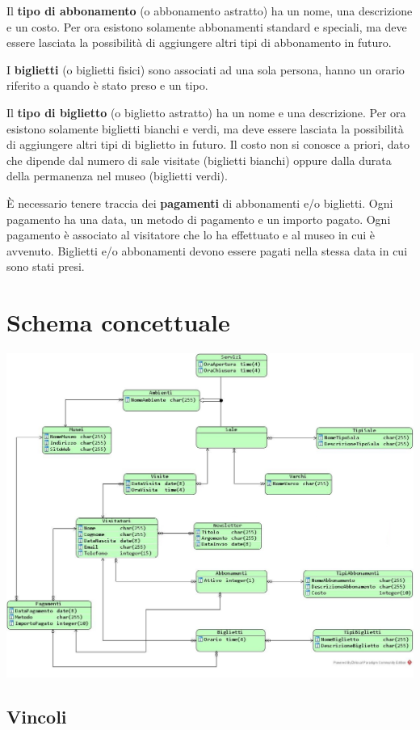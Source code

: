 \documentclass[a4paper, 12pt]{article}
\begin{document}
\noindent Il \textbf{tipo di abbonamento} (o abbonamento astratto) ha un nome, una descrizione e un costo.  Per ora esistono solamente abbonamenti standard e speciali, ma deve essere lasciata la possibilità di aggiungere altri tipi di abbonamento in futuro.

\noindent I \textbf{biglietti} (o biglietti fisici) sono associati ad una sola persona, hanno un orario riferito a quando è stato preso e un tipo.

\noindent Il \textbf{tipo di biglietto} (o biglietto astratto) ha un nome e una descrizione. Per ora esistono solamente biglietti bianchi e verdi, ma deve essere lasciata la possibilità di aggiungere altri tipi di biglietto in futuro. Il costo non si conosce a priori, dato che dipende dal numero di sale visitate (biglietti bianchi) oppure dalla durata della permanenza nel museo (biglietti verdi).

\noindent È necessario tenere traccia dei \textbf{pagamenti} di abbonamenti e/o biglietti. Ogni pagamento ha una data, un metodo di pagamento e un importo pagato. Ogni pagamento è associato al visitatore che lo ha effettuato e al museo in cui è avvenuto. Biglietti e/o abbonamenti devono essere pagati nella stessa data in cui sono stati presi.

\section{Schema concettuale}
\includegraphics[width=17cm]{concettualegiusto.png}

\subsection{Vincoli}
\end{document}
